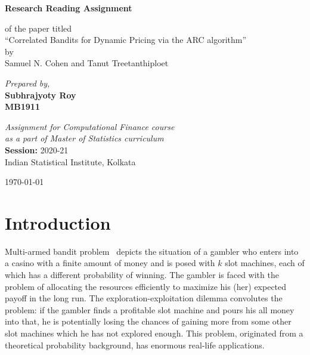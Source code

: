 \documentclass[11pt]{article}
\begin{document}
\begin{titlepage}
    \begin{center}
        \vspace*{5cm}
 
        \Huge{\textbf{Research Reading Assignment}}
 
        \vspace{0.5cm}
        \large{of the paper titled}\\
        \large{``Correlated Bandits for Dynamic Pricing via the ARC algorithm''}\\
        \large{by}\\
        \large{Samuel N. Cohen and Tanut Treetanthiploet}
             
        \vspace{1.5cm}
 
        \large{\textit{Prepared by,}}\\
        \large{\textbf{Subhrajyoty Roy}}\\
        \large{\textbf{MB1911}}
 
        \vspace{2cm}
             
        \textit{Assignment for Computational Finance course\\
        as a part of Master of Statistics curriculum}\\
        \vspace{0.5cm}
        \textbf{Session: } 2020-21\\
        Indian Statistical Institute, Kolkata

        \vfill
        
        \begin{flushright}
            \normalsize{\today}            
        \end{flushright}
    \end{center}
\end{titlepage}

\section{Introduction}

Multi-armed bandit problem~\cite{katehakis1987multi} depicts the situation of a gambler who enters into a casino with a finite amount of money and is posed with $k$ slot machines, each of which has a different probability of winning. The gambler is faced with the problem of allocating the resources efficiently to maximize his (her) expected payoff in the long run. The exploration-exploitation dilemma convolutes the problem: if the gambler finds a profitable slot machine and pours his all money into that, he is potentially losing the chances of gaining more from some other slot machines which he has not explored enough. This problem, originated from a theoretical probability background, has enormous real-life applications.
\end{document}
